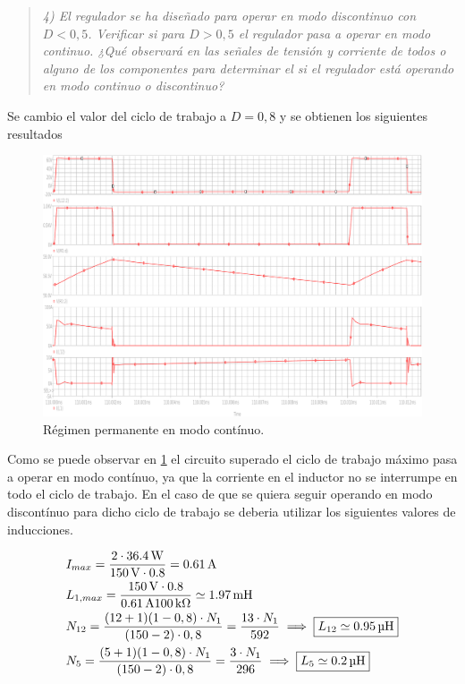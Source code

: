 \begin{quote} \textit{ 4) El regulador se ha diseñado para operar en modo discontinuo con $D<0,5$. Verificar si para $D>0,5$ el regulador pasa a operar en modo continuo. ¿Qué observará en las señales de tensión y corriente de todos o alguno de los componentes para determinar el si el regulador está operando en modo continuo o discontinuo?}
\end{quote}

	Se cambio el valor del ciclo de trabajo a  $ D= 0,8 $ y se obtienen los siguientes resultados

\begin{figure}[H]
	\centering
	\includegraphics[width=\textwidth]{Figuras/ej4_sim.pdf}
	\caption{Régimen permanente en modo contínuo.}
	\label{fig:permanente_mcc}
\end{figure}

	Como se puede observar en \ref{fig:permanente_mcc} el circuito superado el ciclo de trabajo máximo pasa a operar en modo contínuo, ya que la corriente en el inductor no se interrumpe en todo el ciclo de trabajo. 
	\indent En el caso de que se quiera seguir operando en modo discontínuo para dicho ciclo de trabajo se deberia utilizar los siguientes valores de inducciones. 

\begin{align*}
	\centering
	& I_{max} = \frac{ 2 \cdot \SI{36.4}{\watt} }{\SI{150}{\volt} \cdot \num{0,8}} = \SI{0.61}{\ampere} \\
	& L_{1,max} = \frac{\SI{150}{\volt} \cdot \num{0,8}}{\SI{0.61}{\ampere} \SI{100}{\kilo\ohm}} \simeq \SI{1.97}{\milli\henry} \\
	& N_{12} = \frac{ (12+1)(1-0,8) \cdot N_1}{ (150-2) \cdot 0,8} = \frac{13 \cdot N_1}{592} \implies \boxed{L_{12} \simeq \SI{0.95}{\micro\henry}} \\
	& N_5 = \frac{(5+1)(1-0,8) \cdot N_1}{(150-2) \cdot 0,8} = \frac{3 \cdot N_1}{296} \implies \boxed{L_5 \simeq \SI{0.2}{\micro\henry}}
\end{align*}


